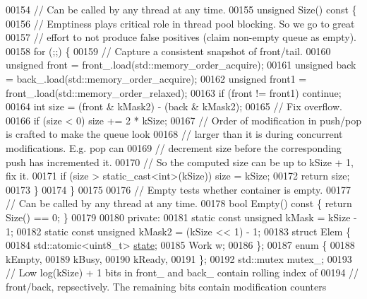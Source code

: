 \begin{DoxyCode}
00154   \textcolor{comment}{// Can be called by any thread at any time.}
00155   \textcolor{keywordtype}{unsigned} Size()\textcolor{keyword}{ const }\{
00156     \textcolor{comment}{// Emptiness plays critical role in thread pool blocking. So we go to great}
00157     \textcolor{comment}{// effort to not produce false positives (claim non-empty queue as empty).}
00158     \textcolor{keywordflow}{for} (;;) \{
00159       \textcolor{comment}{// Capture a consistent snapshot of front/tail.}
00160       \textcolor{keywordtype}{unsigned} front = front\_.load(std::memory\_order\_acquire);
00161       \textcolor{keywordtype}{unsigned} back = back\_.load(std::memory\_order\_acquire);
00162       \textcolor{keywordtype}{unsigned} front1 = front\_.load(std::memory\_order\_relaxed);
00163       \textcolor{keywordflow}{if} (front != front1) \textcolor{keywordflow}{continue};
00164       \textcolor{keywordtype}{int} size = (front & kMask2) - (back & kMask2);
00165       \textcolor{comment}{// Fix overflow.}
00166       \textcolor{keywordflow}{if} (size < 0) size += 2 * kSize;
00167       \textcolor{comment}{// Order of modification in push/pop is crafted to make the queue look}
00168       \textcolor{comment}{// larger than it is during concurrent modifications. E.g. pop can}
00169       \textcolor{comment}{// decrement size before the corresponding push has incremented it.}
00170       \textcolor{comment}{// So the computed size can be up to kSize + 1, fix it.}
00171       \textcolor{keywordflow}{if} (size > static\_cast<int>(kSize)) size = kSize;
00172       \textcolor{keywordflow}{return} size;
00173     \}
00174   \}
00175 
00176   \textcolor{comment}{// Empty tests whether container is empty.}
00177   \textcolor{comment}{// Can be called by any thread at any time.}
00178   \textcolor{keywordtype}{bool} Empty()\textcolor{keyword}{ const }\{ \textcolor{keywordflow}{return} Size() == 0; \}
00179 
00180  \textcolor{keyword}{private}:
00181   \textcolor{keyword}{static} \textcolor{keyword}{const} \textcolor{keywordtype}{unsigned} kMask = kSize - 1;
00182   \textcolor{keyword}{static} \textcolor{keyword}{const} \textcolor{keywordtype}{unsigned} kMask2 = (kSize << 1) - 1;
00183   \textcolor{keyword}{struct }Elem \{
00184     std::atomic<uint8\_t> \hyperlink{structstate}{state};
00185     Work w;
00186   \};
00187   \textcolor{keyword}{enum} \{
00188     kEmpty,
00189     kBusy,
00190     kReady,
00191   \};
00192   std::mutex mutex\_;
00193   \textcolor{comment}{// Low log(kSize) + 1 bits in front\_ and back\_ contain rolling index of}
00194   \textcolor{comment}{// front/back, repsectively. The remaining bits contain modification counters}

\end{DoxyCode}
